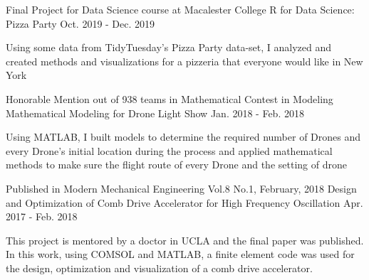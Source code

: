 

\begin{cventries}
  \cventry
    {Final Project for Data Science course at Macalester College} %
    {R for Data Science: Pizza Party} %
    {} %
    {Oct. 2019 - Dec. 2019} %
    {
      \begin{cvitems} %
        \item {Using some data from TidyTuesday’s Pizza Party data-set, I analyzed and created methods and visualizations for a pizzeria that everyone would like in New York}
      \end{cvitems}
    }

  \cventry
    {Honorable Mention out of 938 teams in Mathematical Contest in Modeling} %
    {Mathematical Modeling for Drone Light Show} %
    {} %
    {Jan. 2018 - Feb. 2018} %
    {
      \begin{cvitems} %
        \item {Using MATLAB, I built models to determine the required number of Drones and every Drone’s initial location during the process and applied mathematical methods to make sure the flight route of every Drone and the setting of drone}
      \end{cvitems}
    }


  \cventry
    {Published in Modern Mechanical Engineering Vol.8 No.1, February, 2018} %
    {Design and Optimization of Comb Drive Accelerator for High Frequency Oscillation} %
    {} %
    {Apr. 2017 - Feb. 2018} %
    {
      \begin{cvitems} %
        \item {This project is mentored by a doctor in UCLA and the final paper was published. In this work, using COMSOL and MATLAB, a finite element code was used for the design, optimization and visualization of a comb drive accelerator.}
      \end{cvitems}
    }
    

\end{cventries}
